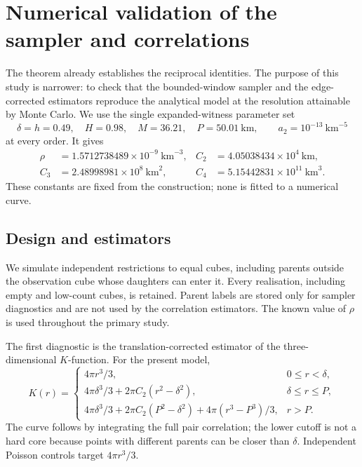 \section{Numerical validation of the sampler and correlations}
\label{sec:simulation}

The theorem already establishes the reciprocal identities. The purpose of this study is narrower: to check that the bounded-window sampler and the edge-corrected estimators reproduce the analytical model at the resolution attainable by Monte Carlo. We use the single expanded-witness parameter set
\[
 \delta=h=0.49,\quad H=0.98,\quad M=36.21,\quad P=50.01\ \mathrm{km},
 \qquad a_2=10^{-13}\ \mathrm{km}^{-5}
\]
at every order. It gives
\begin{align*}
 \rho&=1.5712738489\times10^{-9}\ \mathrm{km}^{-3},
 & C_2&=4.05038434\times10^4\ \mathrm{km},\\
 C_3&=2.48998981\times10^8\ \mathrm{km}^2,
 & C_4&=5.15442831\times10^{11}\ \mathrm{km}^3.
\end{align*}
These constants are fixed from the construction; none is fitted to a numerical curve.

\subsection{Design and estimators}

We simulate independent restrictions to equal cubes, including parents outside the observation cube whose daughters can enter it. Every realisation, including empty and low-count cubes, is retained. Parent labels are stored only for sampler diagnostics and are not used by the correlation estimators. The known value of $\rho$ is used throughout the primary study.

The first diagnostic is the translation-corrected estimator of the three-dimensional $K$-function. For the present model,
\begin{equation}
 K(r)=
 \begin{cases}
 4\pi r^3/3,&0\leq r<\delta,\\
 4\pi\delta^3/3+2\pi C_2(r^2-\delta^2),&\delta\leq r\leq P,\\
 4\pi\delta^3/3+2\pi C_2(P^2-\delta^2)+4\pi(r^3-P^3)/3,&r>P.
 \end{cases}
 \label{eq:K-model}
\end{equation}
The curve follows by integrating the full pair correlation; the lower cutoff is not a hard core because points with different parents can be closer than $\delta$. Independent Poisson controls target $4\pi r^3/3$.

